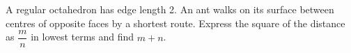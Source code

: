 A regular octahedron has edge length 2. An ant walks on its surface between centres of opposite faces by a shortest route. Express the square of the distance as $\dfrac{m}{n}$ in lowest terms and find $m+n$.

